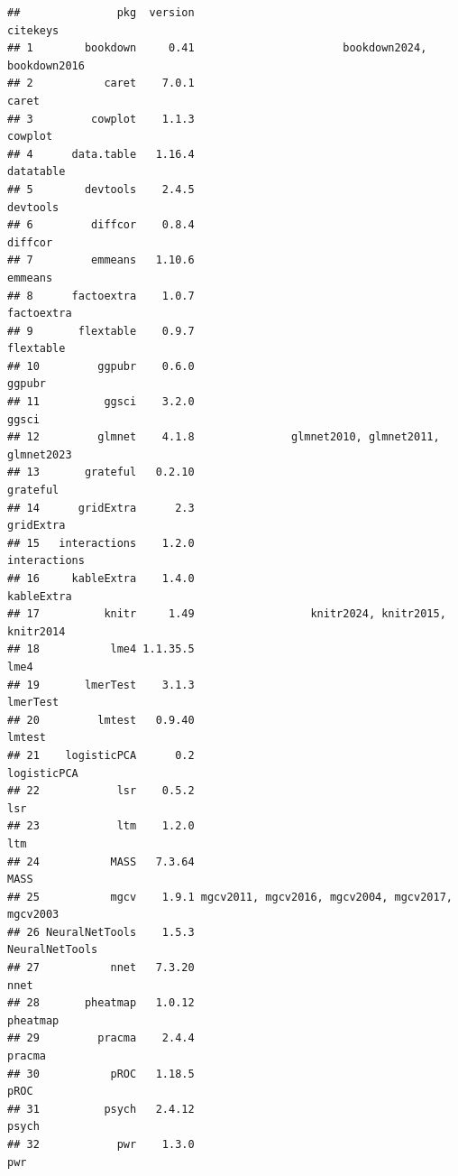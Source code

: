 \documentclass[a4paper, nobind]{templates/ociamthesis}
\begin{document}
\begin{verbatim}
##               pkg  version                                         citekeys
## 1        bookdown     0.41                       bookdown2024, bookdown2016
## 2           caret    7.0.1                                            caret
## 3         cowplot    1.1.3                                          cowplot
## 4      data.table   1.16.4                                        datatable
## 5        devtools    2.4.5                                         devtools
## 6         diffcor    0.8.4                                          diffcor
## 7         emmeans   1.10.6                                          emmeans
## 8      factoextra    1.0.7                                       factoextra
## 9       flextable    0.9.7                                        flextable
## 10         ggpubr    0.6.0                                           ggpubr
## 11          ggsci    3.2.0                                            ggsci
## 12         glmnet    4.1.8               glmnet2010, glmnet2011, glmnet2023
## 13       grateful   0.2.10                                         grateful
## 14      gridExtra      2.3                                        gridExtra
## 15   interactions    1.2.0                                     interactions
## 16     kableExtra    1.4.0                                       kableExtra
## 17          knitr     1.49                  knitr2024, knitr2015, knitr2014
## 18           lme4 1.1.35.5                                             lme4
## 19       lmerTest    3.1.3                                         lmerTest
## 20         lmtest   0.9.40                                           lmtest
## 21    logisticPCA      0.2                                      logisticPCA
## 22            lsr    0.5.2                                              lsr
## 23            ltm    1.2.0                                              ltm
## 24           MASS   7.3.64                                             MASS
## 25           mgcv    1.9.1 mgcv2011, mgcv2016, mgcv2004, mgcv2017, mgcv2003
## 26 NeuralNetTools    1.5.3                                   NeuralNetTools
## 27           nnet   7.3.20                                             nnet
## 28       pheatmap   1.0.12                                         pheatmap
## 29         pracma    2.4.4                                           pracma
## 30           pROC   1.18.5                                             pROC
## 31          psych   2.4.12                                            psych
## 32            pwr    1.3.0                                              pwr

\end{verbatim}
\end{document}
